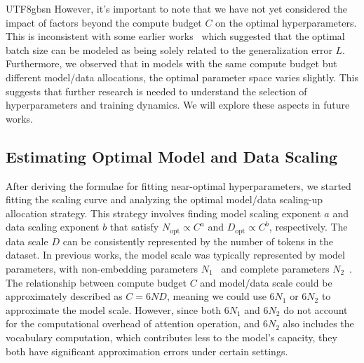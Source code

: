 \documentclass[11pt, a4paper, logo, copyright, nonumbering]{deepseek}
\begin{document}
\begin{CJK*}{UTF8}{gbsn}
However, it's important to note that we have not yet considered the impact of factors beyond the compute budget $C$ on the optimal hyperparameters. This is inconsistent with some earlier works~\citep{mccandlish2018empirical, scalinglaw} which suggested that the optimal batch size can be modeled as being solely related to the generalization error $L$.
Furthermore, we observed that in models with the same compute budget but different model/data allocations, the optimal parameter space varies slightly. This suggests that further research is needed to understand the selection of hyperparameters and training dynamics. We will explore these aspects in future works.

\subsection{Estimating Optimal Model and Data Scaling}

After deriving the formulae for fitting near-optimal hyperparameters, we started fitting the scaling curve and analyzing the optimal model/data scaling-up allocation strategy. 
This strategy involves finding model scaling exponent $a$ and data scaling exponent $b$ that satisfy $N_{\mathrm{opt}} \propto C^a$ and $D_{\mathrm{opt}} \propto C^b$, respectively. The data scale $D$ can be consistently represented by the number of tokens in the dataset. In previous works, the model scale was typically represented by model parameters, with non-embedding parameters $N_1$~\citep{scalinglaw} and complete parameters $N_2$~\citep{chinchilla}. The relationship between compute budget $C$ and model/data scale could be approximately described as $C=6ND$, meaning we could use $6N_1$ or $6N_2$ to approximate the model scale. However, since both $6N_1$ and $6N_2$ do not account for the computational overhead of attention operation, and $6N_2$ also includes the vocabulary computation, which contributes less to the model's capacity, they both have significant approximation errors under certain settings.


\end{CJK*}
\end{document}
